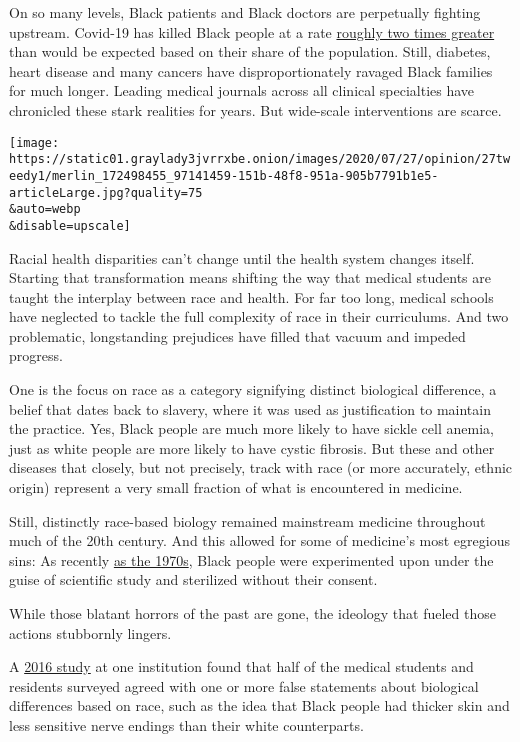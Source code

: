On so many levels, Black patients and Black doctors are perpetually
fighting upstream. Covid-19 has killed Black people at a rate
\href{https://www.npr.org/sections/health-shots/2020/06/22/881886733/black-medicare-patients-with-covid-19-nearly-4-times-as-likely-to-end-up-in-hosp}{roughly
two times greater} than would be expected based on their share of the
population. Still, diabetes, heart disease and many cancers have
disproportionately ravaged Black families for much longer. Leading
medical journals across all clinical specialties have chronicled these
stark realities for years. But wide-scale interventions are scarce.

\texttt{[image: https://static01.graylady3jvrrxbe.onion/images/2020/07/27/opinion/27tweedy1/merlin\_172498455\_97141459-151b-48f8-951a-905b7791b1e5-articleLarge.jpg?quality=75\\\&auto=webp\\\&disable=upscale]}

Racial health disparities can't change until the health system changes
itself. Starting that transformation means shifting the way that medical
students are taught the interplay between race and health. For far too
long, medical schools have neglected to tackle the full complexity of
race in their curriculums. And two problematic, longstanding prejudices
have filled that vacuum and impeded progress.

One is the focus on race as a category signifying distinct biological
difference, a belief that dates back to slavery, where it was used as
justification to maintain the practice. Yes, Black people are much more
likely to have sickle cell anemia, just as white people are more likely
to have cystic fibrosis. But these and other diseases that closely, but
not precisely, track with race (or more accurately, ethnic origin)
represent a very small fraction of what is encountered in medicine.

Still, distinctly race-based biology remained mainstream medicine
throughout much of the 20th century. And this allowed for some of
medicine's most egregious sins: As recently
\href{https://www.cdc.gov/tuskegee/timeline.htm}{as the 1970s}, Black
people were experimented upon under the guise of scientific study and
sterilized without their consent.

While those blatant horrors of the past are gone, the ideology that
fueled those actions stubbornly lingers.

A
\href{https://www.pnas.org/content/early/2016/03/30/1516047113.full}{2016
study} at one institution found that half of the medical students and
residents surveyed agreed with one or more false statements about
biological differences based on race, such as the idea that Black people
had thicker skin and less sensitive nerve endings than their white
counterparts.

